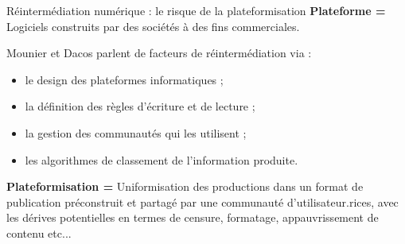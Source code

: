 \begin{frame}{Réintermédiation numérique : le risque de la plateformisation}
    \textbf{Plateforme = } Logiciels construits par des sociétés à des fins commerciales.\\
    \vspace{1em}
    
    Mounier et Dacos parlent de facteurs de réintermédiation via : 
    \begin{itemize}
        \item le design des plateformes informatiques ;
        \item la définition des règles d'écriture et de lecture ;
        \item la gestion des communautés qui les utilisent ;
        \item les algorithmes de classement de l'information produite.
    \end{itemize}
    \textbf{Plateformisation =} Uniformisation des productions dans un format de publication préconstruit et partagé par une communauté d'utilisateur.rices, avec les dérives potentielles en termes de censure, formatage, appauvrissement de contenu etc...\\
\end{frame}
